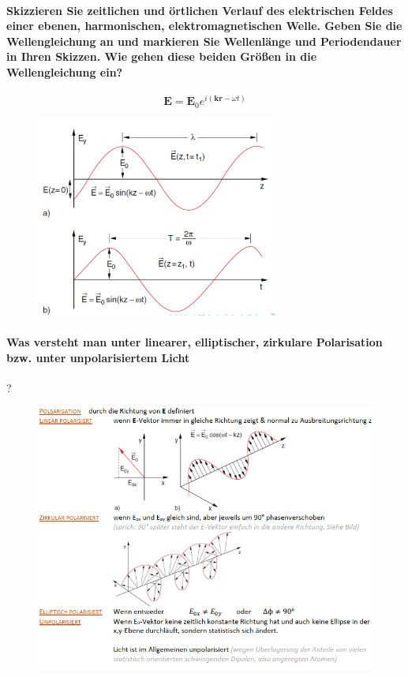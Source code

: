 \documentclass[a4paper, 11pt, parskip=half]{scrartcl}
\begin{document}
\paragraph{Skizzieren Sie zeitlichen und örtlichen Verlauf des elektrischen Feldes einer ebenen,
harmonischen, elektromagnetischen Welle. Geben Sie die Wellengleichung an und markieren Sie
Wellenlänge und Periodendauer in Ihren Skizzen. Wie gehen diese beiden Größen in die Wellengleichung
ein?}
\begin{equation}
\textbf{E} = \textbf{E}_0 e^{i(\textbf{kr} - \omega t)}
\end{equation}
\begin{figure}[H]
    \centering
    \includegraphics[width=8cm]{image/13/2.png}
\end{figure}

\paragraph{Was versteht man unter linearer, elliptischer, zirkulare Polarisation bzw. unter
unpolarisiertem Licht}?
\begin{figure}[H]
    \centering
    \includegraphics[width=14cm]{image/13/3.png}
\end{figure}
\end{document}
